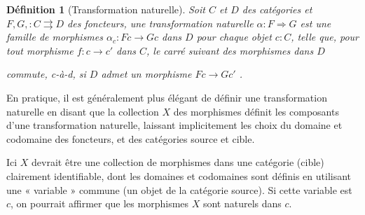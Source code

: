 \documentclass[justified]{tufte-handout}
\newtheorem{definition}{Définition}
\begin{document}
\begin{definition}[Transformation naturelle]
	Soit $C$ et $D$ des catégories et $F, G, : C \rightrightarrows D$ des foncteurs, une transformation naturelle $\alpha : F \Rightarrow G$ est une famille de morphismes $\alpha_c : Fc \rightarrow Gc$ dans $D$ pour chaque objet $c:C$, telle que, pour tout morphisme $f : c \rightarrow c'$ dans $C$, le carré suivant des morphismes dans $D$

	\begin{center}
	\end{center}

	commute, c-à-d, si $D$ admet un morphisme $Fc \rightarrow Gc'$ .
\end{definition}

En pratique, il est généralement plus élégant de définir une transformation
naturelle en disant que la collection $X$ des morphismes définit les composants
d'une transformation naturelle, laissant implicitement les choix du domaine et
codomaine des foncteurs, et des catégories source et cible. \vspace{5pt}

Ici $X$ devrait être une collection de morphismes dans une catégorie (cible)
clairement identifiable, dont les domaines et codomaines sont définis en
utilisant une « variable » commune (un objet de la catégorie source). Si cette
variable est $c$, on pourrait affirmer que les morphismes $X$ sont naturels
dans $c$. \vspace{5pt}
\end{document}
